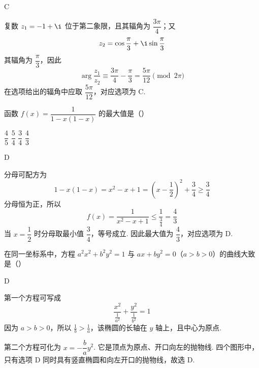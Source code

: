 \begin{answer}
C
\end{answer}

\begin{solution}
复数 \(z_{1}=-1+\i\) 位于第二象限，且其辐角为 \(\dfrac{3\pi}{4}\)；又
\[
z_{2}=\cos\dfrac\pi3+\i\sin\dfrac\pi3
\]
其辐角为 \(\dfrac\pi3\)，因此
\[
\arg\dfrac{z_{1}}{z_{2}}\equiv\dfrac{3\pi}{4}-\dfrac\pi3=\dfrac{5\pi}{12}\pmod{2\pi}
\]
在选项给出的辐角中应取 \(\dfrac{5\pi}{12}\)，对应选项为 C.
\end{solution}

\begin{problem}
函数 \(f(x)=\dfrac{1}{1-x(1-x)}\) 的最大值是（\quad）

\choices
    {\(\dfrac45\)}
    {\(\dfrac54\)}
    {\(\dfrac34\)}
    {\(\dfrac43\)}
\end{problem}

\begin{answer}
D
\end{answer}

\begin{solution}
分母可配方为
\[
1-x(1-x)=x^{2}-x+1=\left(x-\dfrac12\right)^{2}+\dfrac34\geqslant\dfrac34
\]
分母恒为正，所以
\[
f(x)=\dfrac1{x^{2}-x+1}\leqslant\dfrac{1}{\frac34}=\dfrac43
\]
当 \(x=\dfrac12\) 时分母取最小值 \(\dfrac34\)，等号成立. 因此最大值为 \(\dfrac43\)，对应选项为 D.
\end{solution}

\begin{problem}
在同一坐标系中，方程 \(a^{2}x^{2}+b^{2}y^{2}=1\) 与 \(ax+by^{2}=0\)（\(a>b>0\)）的曲线大致是（\quad）

    {}
    {}
    {}
\end{problem}

\begin{answer}
D
\end{answer}

\begin{solution}
第一个方程可写成
\[
\dfrac{x^{2}}{\frac{1}{a^{2}}}+\dfrac{y^{2}}{\frac{1}{b^{2}}}=1
\]
因为 \(a>b>0\)，所以 \(\frac{1}{b}>\frac{1}{a}\)，该椭圆的长轴在 \(y\) 轴上，且中心为原点.

第二个方程可化为 \(x=-\dfrac ba y^{2}\). 它是顶点为原点、开口向左的抛物线. 四个图形中，只有选项 D 同时具有竖直椭圆和向左开口的抛物线，故选 D.
\end{solution}

